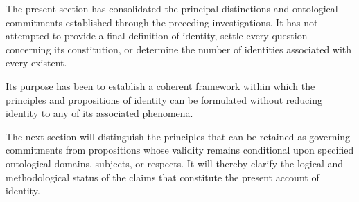 The present section has consolidated the principal
distinctions and ontological commitments established
through the preceding investigations. It has not attempted
to provide a final definition of identity, settle every
question concerning its constitution, or determine the
number of identities associated with every existent.

Its purpose has been to establish a coherent framework
within which the principles and propositions of identity
can be formulated without reducing identity to any of
its associated phenomena.

The next section will distinguish the principles that
can be retained as governing commitments from propositions
whose validity remains conditional upon specified
ontological domains, subjects, or respects. It will
thereby clarify the logical and methodological status
of the claims that constitute the present account of
identity.


